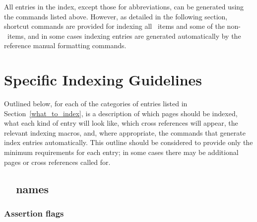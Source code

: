 \documentclass[11pt]{article}
\begin{document}
All entries in the index, except those for abbreviations, can be 
generated using the commands listed above.
However, as detailed in the following section, shortcut commands are 
provided for indexing all \CC\ items and some of the non-\CC\ items, and 
in some cases indexing entries are generated automatically by
the reference manual formatting commands.

\section{Specific Indexing Guidelines}
\label{how_to_index}

Outlined below, for each of the categories of entries listed in 
Section~\ref{what_to_index}, is a description of which pages should be 
indexed, what each kind of entry will look like, which cross references will 
appear, the relevant indexing macros, and, where appropriate, the commands
that generate index entries automatically.  This outline should be considered 
to provide only the minimum requirements for each entry;  in some cases there 
may be additional pages or cross references called for.  

\subsection{\cgal\ \CC\ names}
\label{cgal_names}

\subsubsection{Assertion flags}%
\label{assertion_flags}
\end{document}
